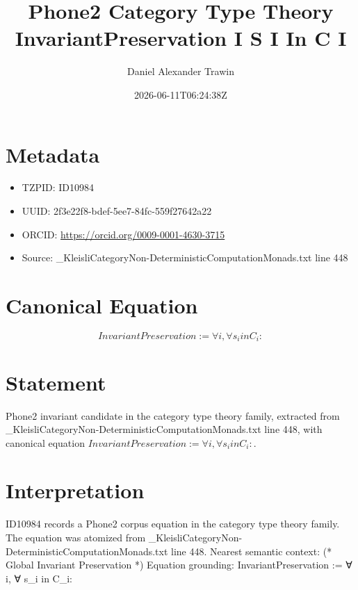 \documentclass[11pt]{article}
\title{Phone2 Category Type Theory InvariantPreservation I S I In C I}
\author{Daniel Alexander Trawin}
\date{2026-06-11T06:24:38Z}
\begin{document}
\maketitle
\section*{Metadata}
\begin{itemize}
\item TZPID: ID10984
\item UUID: 2f3e22f8-bdef-5ee7-84fc-559f27642a22
\item ORCID: \url{https://orcid.org/0009-0001-4630-3715}
\item Source: _KleisliCategoryNon-DeterministicComputationMonads.txt line 448
\end{itemize}
\section*{Canonical Equation}
\[
InvariantPreservation := ∀ i, ∀ s_i in C_i:
\]
\section*{Statement}
Phone2 invariant candidate in the category type theory family, extracted from _KleisliCategoryNon-DeterministicComputationMonads.txt line 448, with canonical equation $InvariantPreservation := ∀ i, ∀ s_i in C_i:$.
\section*{Interpretation}
ID10984 records a Phone2 corpus equation in the category type theory family. The equation was atomized from _KleisliCategoryNon-DeterministicComputationMonads.txt line 448. Nearest semantic context: (* Global Invariant Preservation *) Equation grounding: InvariantPreservation := ∀ i, ∀ s_i in C_i:
\end{document}
